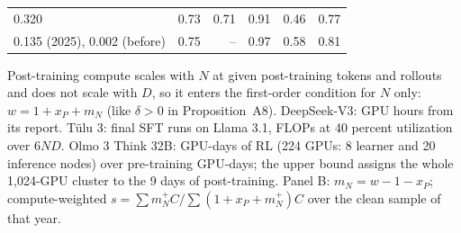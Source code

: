 \begin{table}[tp]
\begin{tabular}{@{}lrrrrr@{}}
0.320 & 0.73 & 0.71 & 0.91 & 0.46 & 0.77 \\
0.135 (2025), 0.002 (before) & 0.75 & -- & 0.97 & 0.58 & 0.81 \\
\bottomrule
\end{tabular}
\medskip
\begin{tablenotes}
Post-training compute scales with $N$ at given post-training tokens and rollouts and does not scale with $D$, so it enters the first-order condition for $N$ only: $w=1+x_P+m_N$ (like $\delta>0$ in Proposition~A8). DeepSeek-V3: GPU hours from its report. T\"ulu 3: final SFT runs on Llama 3.1, FLOPs at 40 percent utilization over $6ND$. Olmo 3 Think 32B: GPU-days of RL (224 GPUs: 8 learner and 20 inference nodes) over pre-training GPU-days; the upper bound assigns the whole 1,024-GPU cluster to the 9 days of post-training. Panel B: $m_N=w-1-x_P$; compute-weighted $s=\sum m_N^+C/\sum(1+x_P+m_N^+)C$ over the clean sample of that year.
\end{tablenotes}
\end{table}
